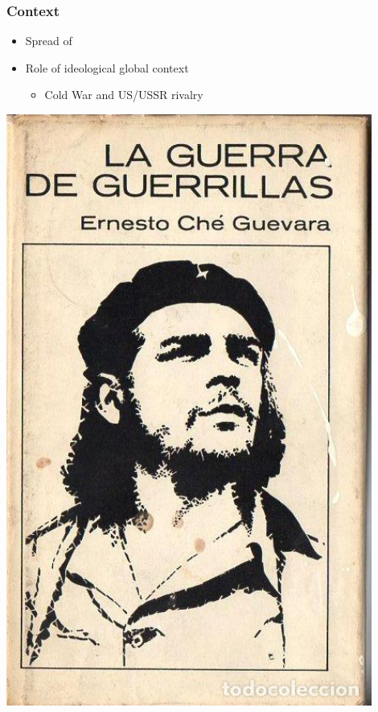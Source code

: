 \documentclass[aspectratio=43]{beamer}
\begin{document}
\begin{frame}
\frametitle{Context}
\centering

\begin{minipage}{0.58\textwidth}\centering
\begin{itemize}
  \item Spread of 
  \item Role of ideological global context
  \begin{itemize}
    \item Cold War and US/USSR rivalry
  \end{itemize}
\end{itemize}
\end{minipage}\hfill
\begin{minipage}{0.4\textwidth}\centering
\includegraphics[width = 0.9\textwidth]{img/guevara}
\end{minipage}

\end{frame}
\end{document}
